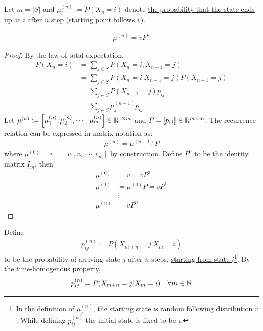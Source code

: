 \documentclass{article}
\begin{document}
    \begin{definition}
    	Let $m = |S|$ and $\mu_i^{(n)} := P(X_n=i)$ denote \ul{the probability that the state ends up at $i$ after $n$ step (starting point follows $v$)}.
    \end{definition}	
    
    \begin{proposition}
    	\begin{align}
    		\mu^{(n)} = v P^n
    	\end{align}
    \end{proposition}
	\begin{proof}
    	By the law of total expectation,
    	\begin{align}
    		P(X_n=i) &= \sum_{j \in S} P(X_n=i, X_{n-1}=j) \\
    		&= \sum_{j \in S} P(X_n=i | X_{n-1}=j) P(X_{n-1}=j) \\
    		&= \sum_{j \in S} P(X_{n-1}=j) p_{ij} \\
    		&= \sum_{j \in S} \mu_{j}^{(n-1)} p_{ij}
    	\end{align}
    	Let $\mu^{(n)} := \left[\mu_1^{(n)}, \mu_2^{(n)}, \cdots, \mu_m^{(n)} \right] \in \mathbb{R}^{1 \times m}$ and $P = [p_{ij}] \in \mathbb{R}^{m \times m}$. The recurrence relation can be expressed in matrix notation as:
    	\begin{align}
    		\mu^{(n)} = \mu^{(n-1)} P
    	\end{align}
    	where $\mu^{(0)} = v = [v_1, v_2, \cdots, v_m]$ by construction. Define $P^0$ to be the identity matrix $I_m$, then
    	\begin{align}
    		\mu^{(0)} &= v = v P^0 \\
    		\mu^{(1)} &= \mu^{(0)} P = v P^1 \\
    		&\vdots \\
    		\mu^{(n)} &= v P^n
    	\end{align}
    \end{proof}
    
    \begin{definition}
    	Define 
    	\begin{align}
    		p_{ij}^{(n)} := P(X_{m+n}=j|X_{m}=i)
    	\end{align}
    	to be the probability of arriving state $j$ after $n$ steps, \ul{starting from state $i$}\footnote{In the definition of $\mu^{(n)}_j$, the starting state is random following distribution $v$. While defining $p^{(n)}_{ij}$ the initial state is fixed to be $i$.}. By the time-homogenous property,
    	\begin{align}
    		p_{ij}^{(n)} = P(X_{m+n}=j|X_{m}=i)\quad \forall m \in \mathbb{N}
    	\end{align}
    \end{definition}
    
\end{document}
